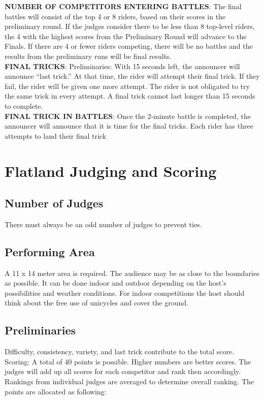 \textbf{NUMBER OF COMPETITORS ENTERING BATTLES}: The final battles will consist of the top 4 or 8 riders, based
on their scores in the preliminary round. If the judges consider there to be less than 8 top-level riders, the 4 with the highest scores from the Preliminary Round will advance to the Finals. If there are 4 or fewer riders competing, there will be no battles and the results from the preliminary runs will be final results.\\
\textbf{FINAL TRICKS}: Preliminaries: With 15 seconds left, the announcer will announce “last trick.” At that time, the rider
will attempt their final trick. If they fail, the rider will be given one more attempt. The rider is not obligated to try the
same trick in every attempt. A final trick cannot last longer than 15 seconds to complete.\\
\textbf{FINAL TRICK IN BATTLES}: Once the 2-minute battle is completed, the announcer will announce that it is time for the final tricks. Each rider has three attempts to land their final trick\\

\section{Flatland Judging and Scoring}

\subsection{Number of Judges}
There must always be an odd number of judges to prevent ties. 

\subsection{Performing Area}
A 11 x 14 meter area is required. The audience may be as close to the boundaries as possible. It can be done indoor and outdoor depending on the host's possibilities and weather conditions. For indoor competitions the host should think about the free use of unicycles and cover the ground.

\subsection{Preliminaries}
Difficulty, consistency, variety, and last trick contribute to the total score. Scoring: A total of 40 points is possible. Higher numbers are better scores. The judges will add up all scores for each competitor and rank then accordingly. Rankings from individual judges are averaged to determine overall ranking. The points are allocated as following: 

